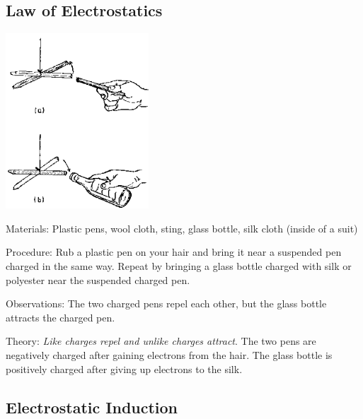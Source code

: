 \begin{multicols}{2}
\subsection{Law of Electrostatics}

\begin{center}
\includegraphics[width=0.4\textwidth]{./img/source/law-electrostatics.png}
\end{center}

\begin{description*}
\item[Materials:]{Plastic pens, wool cloth, sting, glass bottle, silk cloth (inside of a suit)}
\item[Procedure:]{Rub a plastic pen on your hair and bring it near a suspended pen charged in the same way. Repeat by bringing a glass bottle charged with silk or polyester near the suspended charged pen.}
\item[Observations:]{The two charged pens repel each other, but the glass bottle attracts the charged pen.}
\item[Theory:]{\emph{Like charges repel and unlike charges attract}. The two pens are negatively charged after gaining electrons from the hair. The glass bottle is positively charged after giving up electrons to the silk.}
\end{description*}

\subsection{Electrostatic Induction}


\end{multicols}
